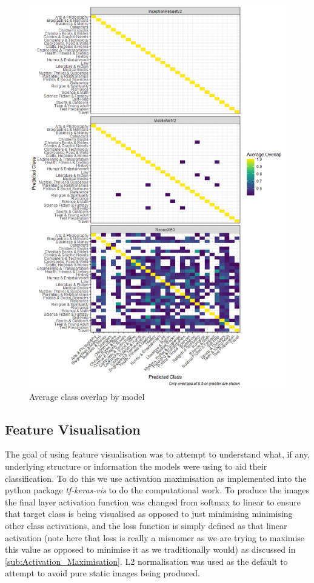 \documentclass[12pt]{article}
\numberwithin{equation}{section}
\numberwithin{figure}{section}
\begin{document}
\begin{figure}
	\centering
	\captionsetup{justification=centering}
	\includegraphics[scale=0.6]{class_pred_overlap.png}
	\caption{Average class overlap by model}
	\label{fig:class_overlap}
\end{figure}
\subsection{Feature Visualisation} 
\label{sub:Feature_Visualisation} 
The goal of using feature visualisation was to attempt to understand what, if any, underlying structure or information the models were using to aid their classification. To do this we use activation maximisation as implemented into the python package \emph{tf-keras-vis}\cite{keras-vis} to do the computational work. To produce the images the final layer activation function was changed from softmax to linear to ensure that target class is being visualised as opposed to just minimising minimising other class activations, and the loss function is simply defined as that linear activation (note here that loss is really a misnomer as we are trying to maximise this value as opposed to minimise it as we traditionally would) as discussed in \cref{sub:Activation_Maximisation}. L2 normalisation was used as the default to attempt to avoid pure static images being produced.
\end{document}
